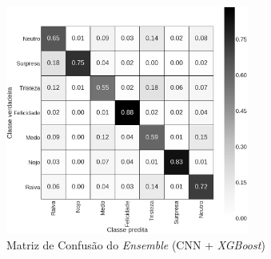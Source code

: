 \begin{figure}[!htb]
    \centering
    \includegraphics[width=8cm]{images/cm_emsemble.png}
    \caption{Matriz de Confusão do \emph{Ensemble} (CNN + \emph{XGBoost})}
    \label{fig:emsemble}
\end{figure}

